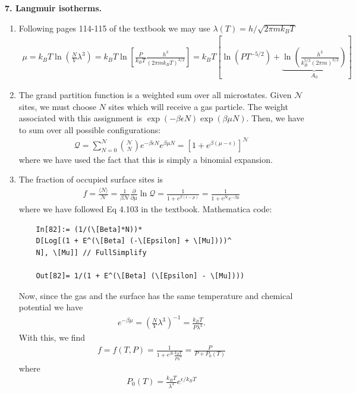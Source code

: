 \documentclass{article}
\theoremstyle{definition}
\newcommand{\p}{\partial}
\newcommand{\be}{\beta}
\newcommand{\f}[2]{\frac{#1}{#2}}
\newcommand{\lp}{\left(}
\newcommand{\rp}{\right)}
\newcommand{\lb}{\left[}
\newcommand{\rb}{\right]}
\begin{document}
\noindent \textbf{7. Langmuir isotherms.}


\begin{enumerate}[label=(\alph*)]
	\item Following pages 114-115 of the textbook we may use $\lambda(T) = h / \sqrt{2\pi m k_B T}$
	\begin{align*}
	\mu = k_BT\ln \lp \f{N}{V}\lambda^3\rp = k_BT \ln \lb \f{P}{k_BT} \f{h^3}{(2\pi m k_B T)^{3/2}}\rb = \boxed{k_BT\lb  \ln (PT^{-5/2}) + \underbrace{\ln \lp \f{h^3}{k_B^{5/2}(2\pi m)^{3/2}} \rp}_{A_0} \rb}
	\end{align*}
	
	\item The grand partition function is a weighted sum over all microstates. Given $\mathcal{N}$ sites, we must choose $N$ sites which will receive a gas particle. The weight associated with this assignment is $\exp(-\be \epsilon N) \exp(\be\mu N)$. Then, we have to sum over all possible configurations:
	\begin{align*}
	\mathcal{Q} = \sum_{N=0}^\mathcal{N} {\mathcal{N}\choose N} e^{-\be \epsilon N}e^{\be\mu N} = \boxed{\lb 1 + e^{\be(\mu-\epsilon)} \rb^\mathcal{N}}
	\end{align*}
	where we have used the fact that this is simply a binomial expansion.
	
	\item The fraction of occupied surface sites is 
	\begin{align*}
	f = \f{\langle N \rangle }{\mathcal{N}} = \f{1}{\be\mathcal{N}}\f{\p}{\p \mu}\ln \mathcal{Q}  = \f{1}{1 + e^{\be(\epsilon-\mu)}} = \f{1}{1 + e^{\be\epsilon}e^{-\be\mu}}
	\end{align*}
	where we have followed Eq 4.103 in the textbook. Mathematica code:
	\begin{lstlisting}
	In[82]:= (1/(\[Beta]*N))*
	D[Log[(1 + E^(\[Beta] (-\[Epsilon] + \[Mu])))^
	N], \[Mu]] // FullSimplify
	
	Out[82]= 1/(1 + E^(\[Beta] (\[Epsilon] - \[Mu])))
	\end{lstlisting}
	
	
	
	Now, since the gas and the surface has the same temperature and chemical potential we have
	\begin{align*}
	e^{-\be\mu} = \lp\f{N}{V}\lambda^3\rp^{-1} = \f{k_BT}{P\lambda^3}.
	\end{align*}
	With this, we find 
	\begin{align*}
	\boxed{f = f(T,P) = \f{1}{1+e^{\be\epsilon} \f{k_BT}{P\lambda^3}} = \f{P}{P+ P_0(T)}}
	\end{align*}
	where
	\begin{align*}
	\boxed{P_0(T) = \f{k_BT}{\lambda^3}e^{\epsilon/k_BT}}
	\end{align*}
	

\end{enumerate}
\end{document}
